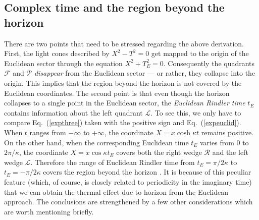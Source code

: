 \documentclass[12pt]{iopart}
\def\eq#1{{Eq.~(\ref{#1})}}
\begin{document}
 


\subsection{Complex time and the region beyond the horizon}\label{sec:complext}

There are two points that need to be stressed regarding the above derivation. First,
the light cones described by $X^2 - T^2=0$ get mapped  to the origin of the Euclidean sector through the equation $X^2 + T_E^2 =0$. Consequently the quadrants $\mathcal{F}$ and $\mathcal{P}$ \textit{disappear} from the Euclidean sector --- or rather, they collapse into the 
origin. This implies that the region beyond the horizon is not covered by the Euclidean coordinates. The second point is that even though  the horizon 
collapses to a single point in the Euclidean sector, the \textit{Euclidean Rindler time} $t_E$
contains information about the left quadrant $\mathcal{L}$. To see this, we only have to compare \eq{expthree} taken with the positive sign  and \eq{expeuclid}.
When  $t$ ranges from $-\infty$ to $+\infty$, the coordinate $X=x\cosh \kappa t$ remains positive. On the other hand, when the corresponding Euclidean time $t_E$ varies from $0$ to 
$2\pi/\kappa$, the coordinate  $X=x\cos\kappa t_E$ covers both the right wedge $\mathcal{R}$
and the left wedge $\mathcal{L}$. Therefore the range of Euclidean Rindler time from  $t_E=\pi/2\kappa$ to $t_E=-\pi/2\kappa$
covers the region beyond the horizon \cite{loctemp}. It is because of this peculiar feature (which, of course, is closely related to periodicity in the imaginary time) that we can obtain
the thermal effect due to horizon from the Euclidean approach. The conclusions are strengthened by  a few other considerations which are worth mentioning briefly. 
\end{document}
